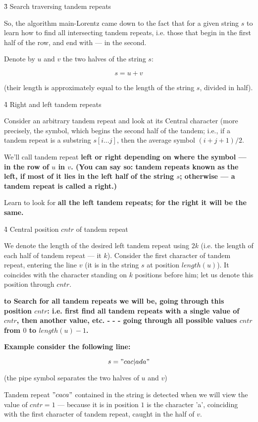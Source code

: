 \h3{ Search traversing tandem repeats }

So, the algorithm main-Lorentz came down to the fact that for a given string $s$ to learn how to find all intersecting tandem repeats, i.e. those that begin in the first half of the row, and end with --- in the second.

Denote by $u$ and $v$ the two halves of the string $s$:

$$ s = u + v $$

(their length is approximately equal to the length of the string $s$, divided in half).


\h4{ Right and left tandem repeats }

Consider an arbitrary tandem repeat and look at its Central character (more precisely, the symbol, which begins the second half of the tandem; i.e., if a tandem repeat is a substring $s[i \ldots j]$, then the average symbol $(i+j+1)/2$.

We'll call tandem repeat \bf{left or right} depending on where the symbol --- in the row of $u$ in $v$. (You can say so: tandem repeats known as the left, if most of it lies in the left half of the string $s$; otherwise --- a tandem repeat is called a right.)

Learn to look for \bf{all the left tandem repeats}; for the right it will be the same.


\h4{ Central position $cntr$ of tandem repeat }

We denote the length of the desired left tandem repeat using $2k$ (i.e. the length of each half of tandem repeat --- it $k$). Consider the first character of tandem repeat, entering the line $v$ (it is in the string $s$ at position $length(u)$). It coincides with the character standing on $k$ positions before him; let us denote this position through $cntr$.

\bf{to Search for all tandem repeats we will be, going through this position $cntr$}: i.e. first find all tandem repeats with a single value of $cntr$, then another value, etc. - - - going through all possible values $cntr$ from $0$ to $length(u)-1$.

\bf{Example} consider the following line:

$$ s = "cac|ada" $$

(the pipe symbol separates the two halves of $u$ and $v$)

Tandem repeat $"caca"$ contained in the string is detected when we will view the value of $cntr = 1$ --- because it is in position $1$ is the character 'a', coinciding with the first character of tandem repeat, caught in the half of $v$.


